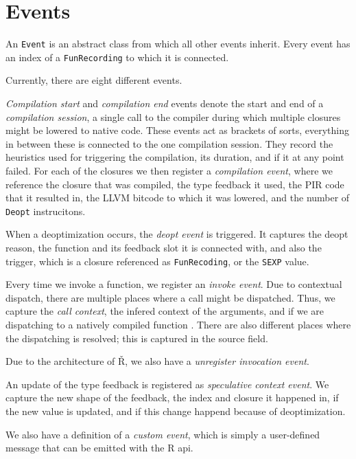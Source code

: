 \section{Events}

An \texttt{Event} is an abstract class from which all other events inherit. Every event has an index of a \texttt{FunRecording} to which it is connected.

Currently, there are eight different events.

\textit{Compilation start} and \textit{compilation end} events denote the start and end of a \textit{compilation session}, a single call to the compiler during which multiple closures might be lowered to native code. These events act as brackets of sorts, everything in between these is connected to the one compilation session. They record the heuristics used for triggering the compilation, its duration, and if it at any point failed. For each of the closures we then register a \textit{compilation event}, where we reference the closure that was compiled, the type feedback it used, the PIR code that it resulted in, the LLVM bitcode to which it was lowered, and the number of \texttt{Deopt} instrucitons.

When a deoptimization occurs, the \textit{deopt event} is triggered. It captures the deopt reason, the function and its feedback slot it is connected with, and also the trigger, which is a closure referenced as \texttt{FunRecoding}, or the \texttt{SEXP} value.

Every time we invoke a function, we register an \textit{invoke event}. Due to contextual dispatch, there are multiple places where a call might be dispatched. Thus, we capture the \textit{call context}, the infered context of the arguments, and if we are dispatching to a natively compiled function . There are also different places where the dispatching is resolved; this is captured in the source field.

Due to the architecture of Ř, we also have a \textit{unregister invocation event}. \todoadd

An update of the type feedback is registered as \textit{speculative context event}. We capture the new shape of the feedback, the index and closure it happened in, if the new value is updated, and if this change happend because of deoptimization.

We also have a definition of a \textit{custom event}, which is simply a user-defined message that can be emitted with the R api.

